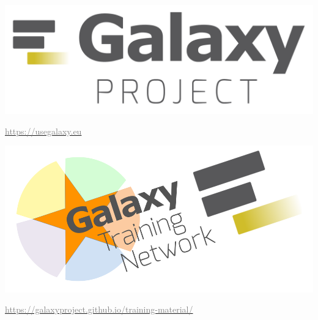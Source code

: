 \documentclass[x11names, svgnames]{beamer}
\begin{document}
%
%
%
\begin{frame}
  \frametitle{\five}
  \begin{center}
    \vspace{-1em}
    \includegraphics[scale=0.11]{images/logo_galaxy}
  \end{center}
  \begin{center}
    \footnotesize{\href{https://usegalaxy.eu}{\textcolor{gray}{https://usegalaxy.eu}}}
  \end{center}
  \begin{center}
    \vspace{2em}
    \includegraphics[scale=0.11]{images/logo_gtn}
  \end{center}
  \begin{center}
    \footnotesize{\href{https://galaxyproject.github.io/training-material/}{\textcolor{gray}{https://galaxyproject.github.io/training-material/}}}
  \end{center}
\end{frame}
\end{document}
